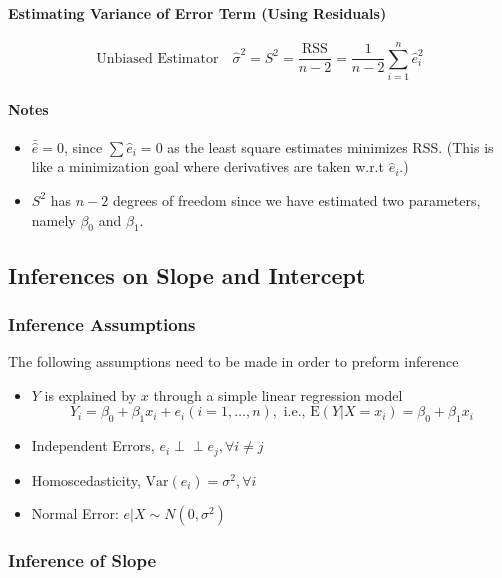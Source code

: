 \documentclass[10pt]{article}
\newcommand{\independent}{\perp \!\!\! \perp}
\begin{document}
\paragraph{Estimating Variance of Error Term (Using Residuals)}
\begin{equation*}
    \text{Unbiased Estimator} \quad \hat{\sigma}^2 = S^{2}=\frac{\mathrm{RSS}}{n-2}=\frac{1}{n-2} \sum_{i=1}^{n} \hat{e}_{i}^{2}
\end{equation*}
\paragraph{Notes}
\begin{itemize}
    \item $\bar{\hat{e}}=0$, since $\sum \hat{e}_i = 0$ as the least square estimates minimizes RSS. (This is like a minimization goal where derivatives are taken w.r.t $\hat{e}_i$.)
    \item $S^2$ has $n-2$ degrees of freedom since we have estimated two parameters, namely $\beta_0$ and $\beta_1$.
\end{itemize}

\subsection{Inferences on Slope and Intercept}
\subsubsection{Inference Assumptions}
The following assumptions need to be made in order to preform inference
\begin{itemize}
    \item $Y$ is explained by $x$ through a simple linear regression model
        \begin{equation*}
            Y_{i}=\beta_{0}+\beta_{1} x_{i}+e_{i}(i=1, \ldots, n), \text { i.e., } \mathrm{E}\left(Y | X=x_{i}\right)=\beta_{0}+\beta_{1} x_{i}
        \end{equation*}
    \item Independent Errors, $e_i \independent e_j, \forall i \neq j$
    \item Homoscedasticity, $\text{Var}(e_i) = \sigma^2, \forall i$
    \item Normal Error: $e | X \sim N\left(0, \sigma^{2}\right)$
\end{itemize}

\subsubsection{Inference of Slope}
\end{document}
